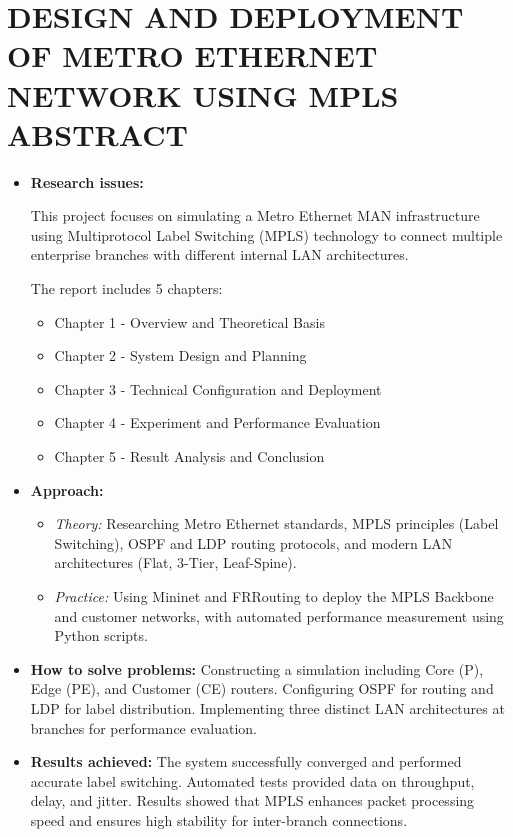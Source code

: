 \section*{\fontsize{16pt}{15pt}\selectfont DESIGN AND DEPLOYMENT OF METRO ETHERNET NETWORK USING MPLS \\ABSTRACT}

\begin{itemize}
    \item[-] \textbf{Research issues:}
    
    This project focuses on simulating a Metro Ethernet MAN infrastructure using Multiprotocol Label Switching (MPLS) technology to connect multiple enterprise branches with different internal LAN architectures.
    
    The report includes 5 chapters:
        \begin{itemize}
        \item[•] Chapter 1 - Overview and Theoretical Basis
        \item[•] Chapter 2 - System Design and Planning
        \item[•] Chapter 3 - Technical Configuration and Deployment
        \item[•] Chapter 4 - Experiment and Performance Evaluation
        \item[•] Chapter 5 - Result Analysis and Conclusion
        \end{itemize}
    \item[-] \textbf{Approach:}
        \begin{itemize}
        \item[•] \textit{Theory:} Researching Metro Ethernet standards, MPLS principles (Label Switching), OSPF and LDP routing protocols, and modern LAN architectures (Flat, 3-Tier, Leaf-Spine).
        \item[•] \textit{Practice:} Using Mininet and FRRouting to deploy the MPLS Backbone and customer networks, with automated performance measurement using Python scripts.
    \end{itemize}
    \item[-] \textbf{How to solve problems:}
    Constructing a simulation including Core (P), Edge (PE), and Customer (CE) routers. Configuring OSPF for routing and LDP for label distribution. Implementing three distinct LAN architectures at branches for performance evaluation.
    \item[-] \textbf{Results achieved:}
    The system successfully converged and performed accurate label switching. Automated tests provided data on throughput, delay, and jitter. Results showed that MPLS enhances packet processing speed and ensures high stability for inter-branch connections.
\end{itemize}

\newpage